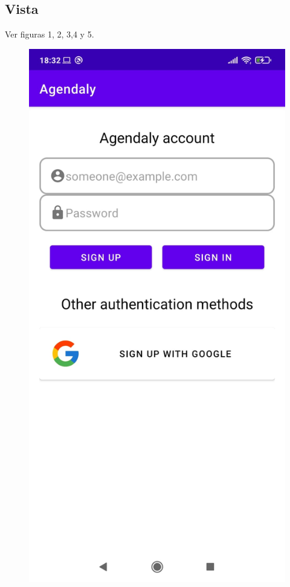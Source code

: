 \documentclass[a4paper,openright,12pt]{article}
\begin{document}
\subsection{Vista}
Ver figuras 1, 2, 3,4 y 5.
\begin{figure}
            \includegraphics[scale=0.05]{view.jpeg} \hfill

\end{figure}
\end{document}
